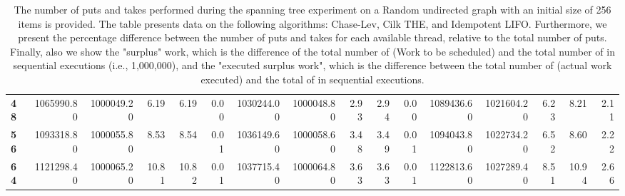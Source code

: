 \begin{table}[!ht]
{\begin{tabular}{lrrrrrrrrrrrrrrr}
\textbf{48} & 1065990.80 & 1000049.20 &           6.19 &        6.19 &                 0.00 & 1030244.00 & 1000048.80 &           2.93 &        2.94 &                 0.00 &      1089436.60 & 1021604.20 &           6.23 &        8.21 &                 2.11 \\
\textbf{56} & 1093318.80 & 1000055.80 &           8.53 &        8.54 &                 0.01 & 1036149.60 & 1000058.60 &           3.48 &        3.49 &                 0.01 &      1094043.80 & 1022734.20 &           6.52 &        8.60 &                 2.22 \\
\textbf{64} & 1121298.40 & 1000065.20 &          10.81 &       10.82 &                 0.01 & 1037715.40 & 1000064.80 &           3.63 &        3.63 &                 0.01 &      1122813.60 & 1027289.40 &           8.51 &       10.94 &                 2.66 \\
\bottomrule
\end{tabular}}
\label{difference-Random_directed-256-CHASELEV-CILK-IDEMPOTENT_LIFO}
\caption{The number of puts and takes performed during the
    spanning tree experiment on a Random undirected graph with an initial size
    of 256 items is provided. The table presents data on the
    following algorithms: Chase-Lev, Cilk THE, and
    Idempotent LIFO. Furthermore, we present the percentage difference
    between the number of puts and takes for each available thread,
    relative to the total number of puts. Finally, also we show the
    "surplus" work, which is the difference of the total number of
    \Puts (Work to be scheduled) and the total number of \Puts in
    sequential executions (i.e., 1,000,000), and the "executed surplus
    work", which is the difference between the total number of \Takes
    (actual work executed) and the total of \Takes in sequential
    executions.}
\end{table}

